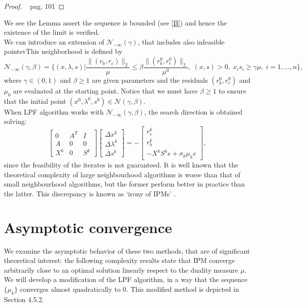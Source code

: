 \documentclass[a4paper,10 pt,titlepage,twoside]{book}
\theoremstyle{plain}
\theoremstyle{definition}
\theoremstyle{remark}
\begin{document}
\begin{proof}
	~\cite{Wright} pag. 101
\end{proof}
We see the Lemma assert the sequence is bounded (see \ref{B}) and hence the existence of the limit is verified.\\
We can introduce an extension of $\mathcal{N}_{-\infty}(\gamma)$, that includes also infeasible pointsvThis neighborhood is defined by
\begin{equation}\label{neigh3}
\mathcal{N}_{-\infty}(\gamma,\beta) =\Bigg\{(x, \lambda, s) | \frac{\lVert(r_{b}, r_{c})\rVert_{2}}{\mu} \leq \beta\frac{\lVert(r_{b}^{0}, r_{c}^{0})\rVert_{2}}{\mu^{0}},\; (x, s)>0,\; x_{i}s_{i} \geq \gamma\mu,\;i = 1,\dots, n \Bigg\},
\end{equation}
where $\gamma\in(0,1)$ and $\beta \geq 1$ are given parameters and the residuals $(r_{b}^{0}, r_{c}^{0})$ and $\mu_{0}$ are evaluated at the starting point. Notice that we must have $\beta \geq 1$ to ensure that the initial point $(x^{0}, \lambda^{0}, s^{0})\in\mathcal{N}(\gamma,\beta)$.\\
When LPF algorithm works with $\mathcal{N}_{-\infty}(\gamma,\beta)$, the search direction is obtained solving:
\begin{equation}\label{matrix:LPF}
\begin{bmatrix}
0&A^{T}&I \\A&0&0\\X^{k}&0&S^{k}
\end{bmatrix}\begin{bmatrix}
\Delta x^{k}\\\Delta\lambda^{k} \\\Delta s^{k}
\end{bmatrix}=-\begin{bmatrix}
r_{c}^{k}\\r_{b}^{k}\\-X^{k}S^{k}e + \sigma_{k}\mu_{k}e
\end{bmatrix},
\end{equation}
since the feasibility of the iterates is not guaranteed. It is well known that the theoretical complexity of large neighbourhood algorithms is
worse than that of small neighbourhood algorithms, but the former perform better in practice than the latter. This discrepancy is known as ‘irony of IPMs’ \cite{rene}. 
\section{Asymptotic convergence}
We examine the asymptotic behavior of these two methods, that are of significant theoretical interest: the following complexity results state that IPM converge arbitrarily close to an optimal solution linearly respect to the duality measure $\mu$. We will develop a modification of the LPF algorithm, in a way that the sequence $\{\mu_{k}\}$ converges almost quadratically to 0. This modified method is depicted in Section 4.5.2.\\
\end{document}

